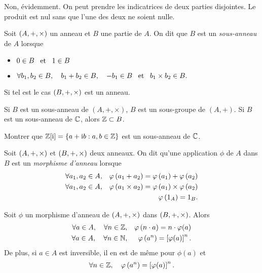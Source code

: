 \documentclass{magnolia}
\begin{document}
\begin{sol}
Non, évidemment. On peut prendre les indicatrices de deux parties disjointes. Le produit est nul sans que l'une des deux ne soient nulle.
\end{sol}


\begin{definition}
Soit $\left(A,+,\times\right)$ un anneau et $B$ une partie de $A$. On dit que $B$ est un
\emph{sous-anneau} de $A$ lorsque
\begin{itemize}
\item $0\in B \quad\!\text{et}\quad\! 1\in B$
\item $\forall b_1,b_2\in B ,\quad b_1+b_2\in B ,\quad -b_1\in B \quad\!\text{et}\quad\! b_1\times b_2\in B.$
\end{itemize}
Si tel est le cas $\left(B,+,\times\right)$ est un anneau.
\end{definition}

\begin{remarques}
\remarque Si $B$ est un sous-anneau de $(A,+,\times)$, $B$ est un
  sous-groupe de $(A,+)$.
\remarque Si $B$ est un sous-anneau de $\mathbb{C}$, alors $\mathbb{Z}\subset B$.
\end{remarques}

\begin{exoUnique}
\exo Montrer que $\mathbb{Z}[{\rm i}]=\left\{a+{\rm i} b : a,b\in\mathbb{Z}\right\}$ est un sous-anneau de $\mathbb{C}$.
\end{exoUnique}

\begin{definition}
Soit $\left(A,+,\times\right)$ et $\left(B,+,\times\right)$ deux anneaux. On dit qu'une
application $\phi$ de $A$ dans $B$ est un \emph{morphisme d'anneau} lorsque
\begin{eqnarray*}
\forall a_1,a_2\in A, & & \varphi\left(a_1+ a_2\right)=\varphi\left(a_1\right)+\varphi\left(a_2\right)\\
\forall a_1,a_2\in A, & & \varphi\left(a_1\times a_2\right)=\varphi\left(a_1\right)\times\varphi\left(a_2\right)\\
& & \varphi\left(1_A\right)=1_B.
\end{eqnarray*}
\end{definition}

\begin{proposition}
Soit $\phi$ un morphisme d'anneau de $\left(A,+,\times\right)$ dans $\left(B,+,\times\right)$.
Alors
\begin{eqnarray*}
\forall a\in A ,\quad \forall n\in\mathbb{Z}, & & \varphi\left(n\cdot a\right)=n\cdot\varphi(a)\\
\forall a\in A ,\quad \forall n\in\mathbb{N}, & & \varphi\left(a^n\right)=\left[\varphi(a)\right]^n.
\end{eqnarray*}
De plus, si $a\in A$ est inversible, il en est de même pour $\phi(a)$ et
\[\forall n\in\mathbb{Z} ,\quad \varphi\left(a^n\right)=\left[\varphi(a)\right]^n.\]
\end{proposition}
\end{document}
